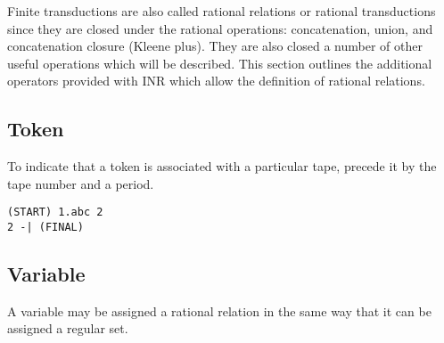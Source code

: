 Finite transductions are also called rational relations or rational
transductions since they are closed under the rational operations:
concatenation, union, and concatenation closure (Kleene plus).
They are also closed a number of other useful operations which will be
described.
This section outlines the additional operators provided with INR which
allow the definition of rational relations.

\subsection{Token}
To indicate that a token is associated with a particular tape, precede it
by the tape number and a period.
\begin{center}\begin{minipage}[t]{3in}\begin{minipage}[t]{3in}\end{minipage}\end{minipage}
\begin{minipage}[t]{1.6in}\begin{verbatim}
(START) 1.abc 2
2 -| (FINAL)
\end{verbatim}\end{minipage}\end{center}

\subsection{Variable}
A variable may be assigned a rational relation in the same way that it can
be assigned a regular set.

